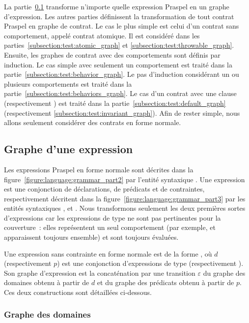 La partie~\ref{subsection:test:expression_graph} transforme n'importe quelle
expression Praspel en un graphe d'expression. Les autres parties définissent la
transformation de tout contrat Praspel en graphe de contrat. Le cas le plus
simple est celui d'un contrat sans comportement, appelé {\strong contrat
atomique}. Il est considéré dans les parties~\ref{subsection:test:atomic_graph}
et \ref{subsection:test:throwable_graph}. Ensuite, les graphes de contrat avec
des comportements sont définis par induction. Le cas simple avec seulement un
comportement est traité dans la partie~\ref{subsection:test:behavior_graph}. Le
pas d'induction considérant un ou plusieurs comportements est traité dans la
partie~\ref{subsection:test:behaviors_graph}. Le cas d'un contrat avec une
clause \adefault (respectivement \ainvariant) est traité dans la
partie~\ref{subsection:test:default_graph} (respectivement
\ref{subsection:test:invariant_graph}). Afin de rester simple, nous allons
seulement considérer des contrats en forme normale.

\subsection{Graphe d'une expression}
\label{subsection:test:expression_graph}

Les expressions Praspel en forme normale sont décrites dans la
figure~\ref{figure:language:grammar_part2} par l'entité syntaxique
. Une expression est une conjonction de déclarations, de
prédicats et de contraintes, respectivement décritent dans la
figure~\ref{figure:language:grammar_part3} par les entités syntaxiques
,  et . Nous transformons
seulement les deux premières sortes d'expressions car les expressions de type
 ne sont pas pertinentes pour la couverture~: elles
représentent un seul comportement (par exemple,  et
 apparaissent toujours ensemble) et sont toujours évaluées.

Une expression sans contrainte en forme normale est de la forme , où $d$ (respectivement $p$) est une conjonction d'expressions de type
 (respectivement ). Son graphe d'expression
est la concaténation par une transition $\varepsilon$ du {\strong graphe des
domaines} obtenu à partir de $d$ et du {\strong graphe des prédicats} obtenu à
partir de $p$. Ces deux constructions sont détaillées ci-dessous.

\subsubsection{Graphe des domaines}

